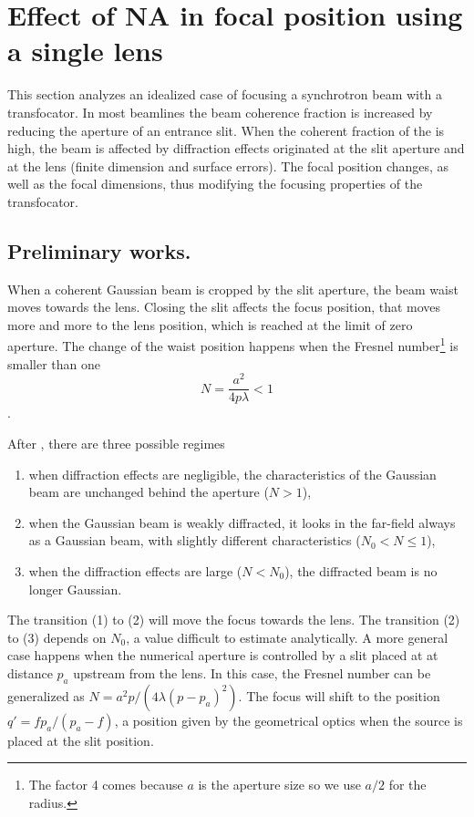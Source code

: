 \documentclass{iucr}              %
\begin{document}
\section{Effect of NA in focal position using a single lens}\label{sec:onelens}

This section analyzes an idealized case of focusing a synchrotron beam with a transfocator. In most beamlines the beam coherence fraction is increased by reducing the aperture of an entrance slit. When the coherent fraction of the is high, the beam is affected by diffraction effects originated at the slit aperture and at the lens (finite dimension and surface errors). The focal position changes, as well as the focal dimensions, thus modifying the focusing properties of the transfocator. 

\subsection{Preliminary works.}

When a coherent Gaussian beam is cropped by the slit aperture, the beam waist moves towards the lens. Closing the slit affects the focus position, that moves more and more to the lens position, which is reached at the limit of zero aperture. The change of the waist position happens when the Fresnel number\footnote{The factor 4 comes because $a$ is the aperture size so we use $a/2$ for the radius.} is smaller than one
\begin{equation}
    N = \frac{a^2}{4 p \lambda}  < 1
\end{equation}. 

After \cite{Belland:82}, there are three possible regimes 
\begin{enumerate}
\item when diffraction effects are negligible, the
characteristics of the Gaussian beam are unchanged
behind the aperture ($N>1$),
\item when the Gaussian
beam is weakly diffracted, it looks in the far-field always as a Gaussian beam, with slightly different characteristics ($N_0<N \le 1$),
\item when the diffraction effects are large ($N<N_0$),
the diffracted beam is no longer Gaussian.
\end{enumerate}

The transition (1) to (2) will move the focus towards the lens. The transition (2) to (3) depends on $N_0$, a value difficult to estimate analytically. A more general case happens when the numerical aperture is controlled by a slit placed at at distance $p_a$ upstream from the lens. 
In this case, the Fresnel number can be generalized as $N=a^2 p / (4 \lambda (p-p_a)^2)$. The focus will shift to the position $q'=f p_a/(p_a-f)$, a position given by the geometrical optics when the source is placed at the slit position. 
\end{document}
